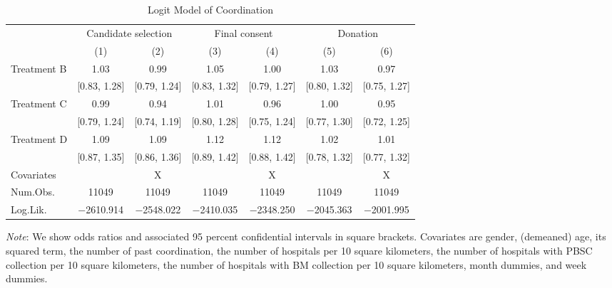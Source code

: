 \documentclass[12pt, a4paper]{article}
\begin{document}
\begin{table}[H]

\caption{\label{tab:coordinate-logit}Logit Model of Coordination}
\centering
\fontsize{9}{11}\selectfont
\begin{threeparttable}
\begin{tabular}[t]{lcccccc}
\toprule
\multicolumn{1}{c}{ } & \multicolumn{2}{c}{Candidate selection} & \multicolumn{2}{c}{Final consent} & \multicolumn{2}{c}{Donation} \\
\cmidrule(l{3pt}r{3pt}){2-3} \cmidrule(l{3pt}r{3pt}){4-5} \cmidrule(l{3pt}r{3pt}){6-7}
  & (1) & (2) & (3) & (4) & (5) & (6)\\
\midrule
Treatment B & \num{1.03} & \num{0.99} & \num{1.05} & \num{1.00} & \num{1.03} & \num{0.97}\\
 & {}[\num{0.83}, \num{1.28}] & {}[\num{0.79}, \num{1.24}] & {}[\num{0.83}, \num{1.32}] & {}[\num{0.79}, \num{1.27}] & {}[\num{0.80}, \num{1.32}] & {}[\num{0.75}, \num{1.27}]\\
Treatment C & \num{0.99} & \num{0.94} & \num{1.01} & \num{0.96} & \num{1.00} & \num{0.95}\\
 & {}[\num{0.79}, \num{1.24}] & {}[\num{0.74}, \num{1.19}] & {}[\num{0.80}, \num{1.28}] & {}[\num{0.75}, \num{1.24}] & {}[\num{0.77}, \num{1.30}] & {}[\num{0.72}, \num{1.25}]\\
Treatment D & \num{1.09} & \num{1.09} & \num{1.12} & \num{1.12} & \num{1.02} & \num{1.01}\\
 & {}[\num{0.87}, \num{1.35}] & {}[\num{0.86}, \num{1.36}] & {}[\num{0.89}, \num{1.42}] & {}[\num{0.88}, \num{1.42}] & {}[\num{0.78}, \num{1.32}] & {}[\num{0.77}, \num{1.32}]\\
\midrule
Covariates &  & X &  & X &  & X\\
Num.Obs. & \num{11049} & \num{11049} & \num{11049} & \num{11049} & \num{11049} & \num{11049}\\
Log.Lik. & \num{-2610.914} & \num{-2548.022} & \num{-2410.035} & \num{-2348.250} & \num{-2045.363} & \num{-2001.995}\\
\bottomrule
\end{tabular}
\begin{tablenotes}
\item \emph{Note}: We show odds ratios and associated 95 percent confidential intervals in square brackets. Covariates are gender, (demeaned) age, its squared term, the number of past coordination, the number of hospitals per 10 square kilometers, the number of hospitals with PBSC collection per 10 square kilometers, the number of hospitals with BM collection per 10 square kilometers, month dummies, and week dummies.
\end{tablenotes}
\end{threeparttable}
\end{table}
\end{document}
